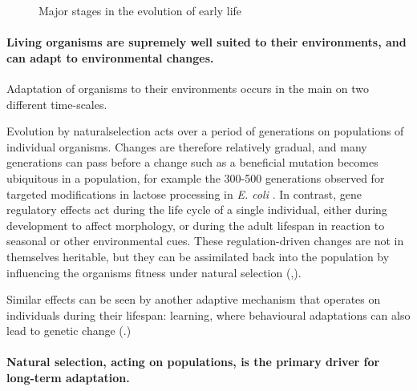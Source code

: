 \begin{figure}
	\begin{center}
	\end{center}
	\caption{Major stages in the evolution of early life}
	\label{major-stages-early-life}
\end{figure}

\paragraph{Living organisms are supremely well suited to their environments, and can adapt to environmental changes.}

Adaptation of organisms to their environments occurs in the main on two different time-scales.

Evolution by \gls{naturalselection} acts over a period of generations on populations of individual organisms. Changes are therefore relatively gradual, and many generations can pass before a change such as a beneficial mutation becomes ubiquitous in a population, for example the 300-500 generations observed for targeted modifications in lactose processing in \emph{E. coli} \parencite{Dekel:2005fk}. In contrast, gene regulatory effects act during the life cycle of a single individual, either during development to affect morphology, or during the adult lifespan in reaction to seasonal or other environmental cues. These regulation-driven changes are not in themselves heritable, but they can be assimilated back into the population by influencing the organisms fitness under natural selection (\eg,\cite{Baldwin:1896ly,Dennett:2003ve,Paenke:2009xe,Paenke:2007ve}).

Similar effects can be seen by another adaptive mechanism that operates on individuals during their lifespan: learning, where behavioural adaptations can also lead to genetic change (\eg \cite{Hinton:1987vy}.)

\paragraph{Natural selection, acting on populations, is the primary driver for long-term adaptation.}

